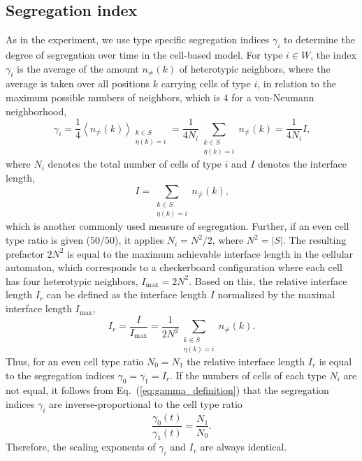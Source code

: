 \documentclass[10pt,letterpaper]{article}
\renewcommand{\eqref}[1]{Eq.~(\ref{eq:#1})}
\begin{document}
\subsection*{Segregation index}
As in the experiment, we use type specific segregation indices $\gamma_i$ to
determine the degree of segregation over time in the cell-based model.
For type $i \in W$, the index $\gamma_i$ is the average of the amount
$n_{\neq}(k)$ of heterotypic neighbors, where the average is taken over all
positions $k$ carrying cells of type $i$, in relation to the maximum possible
numbers of neighbors, which is $4$ for a von-Neumann neighborhood,
%
\begin{equation}
  \label{eq:gamma_definition}
  \gamma_i=\frac{1}{4}\left\langle
    n_{\neq}(k)\right\rangle_{\substack{k\in S \\
      \eta(k)=i}}=\frac{1}{4N_i}\sum_{\substack{k\in S \\
      \eta(k)=i}}{n_{\neq}(k)}=\frac{1}{4N_i}I \text{,}
\end{equation}
where $N_i$ denotes the total number of cells of type $i$ and $I$
denotes the interface length,
%
\begin{equation}
  \label{eq:interface_length_definition}
  I=\sum_{\substack{k\in S \\
      \eta(k)=i}}{n_{\neq}(k)}\text{,}
\end{equation}
%
which is another commonly used measure of segregation. Further, if an even
cell type ratio is given ($50/50$), it applies $N_i=N^2/2$, where
$N^2=\vert S\vert$. The resulting prefactor $2N^2$ is equal to the maximum
achievable interface length in the cellular automaton, which corresponds
to a checkerboard configuration where each cell has four heterotypic
neighbors, $I_\text{max}=2N^2$. Based on this, the relative interface
length $I_r$ can be defined as the interface length $I$ normalized by
the maximal interface length $I_\text{max}$,
%
\begin{equation}
  \label{eq:rel_interface_length_definition}
  I_r= \frac{I}{I_\text{max}}= \frac{1}{2N^2}\sum_{\substack{k\in S \\
  \eta(k)=i}}{n_{\neq}(k)}\text{.}
\end{equation}
%
Thus, for an even cell
type ratio $N_0=N_1$ the relative interface length $I_r$ is equal to
the segregation indices $\gamma_0=\gamma_1=I_r$. If the numbers of
cells of each type $N_i$ are not equal, it follows from \eqref{gamma_definition}
that the segregation indices $\gamma_i$ are inverse-proportional to
the cell type ratio
%
\begin{equation}
  \label{eq:gamma_celltyperatio}
  \frac{\gamma_0(t)}{\gamma_1(t)}=\frac{N_1}{N_0}\text{.}
\end{equation}
%
Therefore, the scaling exponents of $\gamma_i$ and $I_r$ are always identical.
\end{document}
